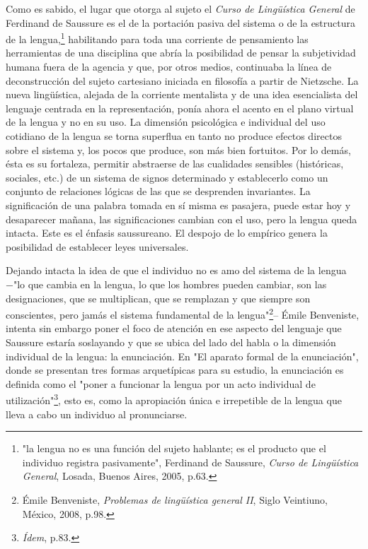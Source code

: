 \documentclass{book}
\begin{document}
Como es sabido, el lugar que otorga al sujeto el \emph{Curso de
Lingüística General} de Ferdinand de Saussure es el de la portación
pasiva del sistema o de la estructura de la lengua,\footnote{"la lengua
  no es una función del sujeto hablante; es el producto que el individuo
  registra pasivamente", Ferdinand de Saussure, \emph{Curso de
  Lingüística General}, Losada, Buenos Aires, 2005, p.63.} habilitando
para toda una corriente de pensamiento las herramientas de una
disciplina que abría la posibilidad de pensar la subjetividad humana
fuera de la agencia y que, por otros medios, continuaba la línea de
deconstrucción del sujeto cartesiano iniciada en filosofía a partir de
Nietzsche. La nueva lingüística, alejada de la corriente mentalista y de
una idea esencialista del lenguaje centrada en la representación, ponía
ahora el acento en el plano virtual de la lengua y no en su uso. La
dimensión psicológica e individual del uso cotidiano de la lengua se
torna superflua en tanto no produce efectos directos sobre el sistema y,
los pocos que produce, son más bien fortuitos. Por lo demás, ésta es su
fortaleza, permitir abstraerse de las cualidades sensibles (históricas,
sociales, etc.) de un sistema de signos determinado y establecerlo como
un conjunto de relaciones lógicas de las que se desprenden invariantes.
La significación de una palabra tomada en sí misma es pasajera, puede
estar hoy y desaparecer mañana, las significaciones cambian con el uso,
pero la lengua queda intacta. Este es el énfasis saussureano. El despojo
de lo empírico genera la posibilidad de establecer leyes universales.

Dejando intacta la idea de que el individuo no es amo del sistema de la
lengua −"lo que cambia en la lengua, lo que los hombres pueden cambiar,
son las designaciones, que se multiplican, que se remplazan y que
siempre son conscientes, pero jamás el sistema fundamental de la
lengua"\footnote{Émile Benveniste, \emph{Problemas de lingüística
  general II}, Siglo Veintiuno, México, 2008, p.98.}-- Émile Benveniste,
intenta sin embargo poner el foco de atención en ese aspecto del
lenguaje que Saussure estaría soslayando y que se ubica del lado del
habla o la dimensión individual de la lengua: la enunciación. En "El
aparato formal de la enunciación", donde se presentan tres formas
arquetípicas para su estudio, la enunciación es definida como el "poner
a funcionar la lengua por un acto individual de utilización"\footnote{\emph{Ídem},
  p.83.}, esto es, como la apropiación única e irrepetible de la lengua
que lleva a cabo un individuo al pronunciarse.
\end{document}
